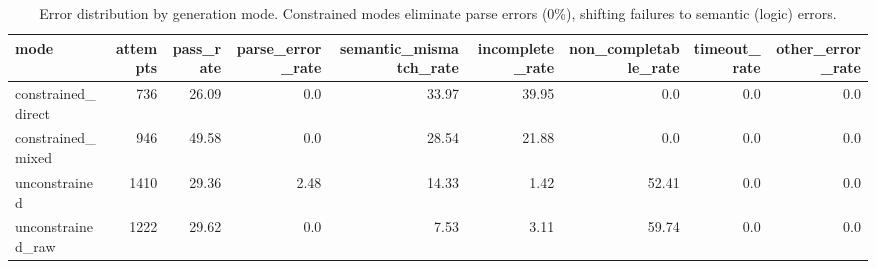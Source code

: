 \begin{table}[htbp]
  \centering
  \caption{Error distribution by generation mode. Constrained modes eliminate parse errors (0\%), shifting failures to semantic (logic) errors.}
  \label{tab:error_breakdown}
  \begin{tabular}{lrrrrrrrr}
    \toprule
    mode & attempts & pass_rate & parse_error_rate & semantic_mismatch_rate & incomplete_rate & non_completable_rate & timeout_rate & other_error_rate \\
    \midrule
    constrained_direct & 736 & 26.09 & 0.0 & 33.97 & 39.95 & 0.0 & 0.0 & 0.0 \\
    constrained_mixed & 946 & 49.58 & 0.0 & 28.54 & 21.88 & 0.0 & 0.0 & 0.0 \\
    unconstrained & 1410 & 29.36 & 2.48 & 14.33 & 1.42 & 52.41 & 0.0 & 0.0 \\
    unconstrained_raw & 1222 & 29.62 & 0.0 & 7.53 & 3.11 & 59.74 & 0.0 & 0.0 \\
    \bottomrule
  \end{tabular}
\end{table}